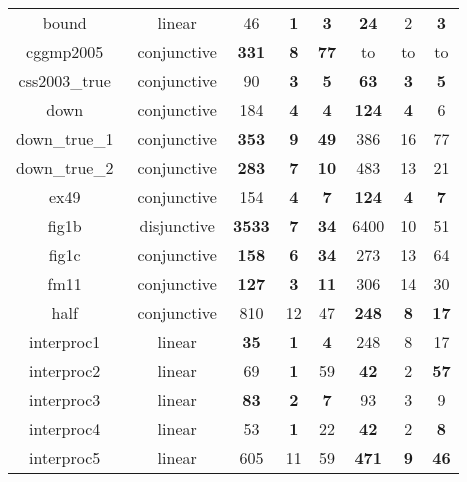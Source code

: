 \begin{table}[t]
\begin{tabular}{l c | c c c | c c c |}
\multicolumn{1}{|c|}{bound~\cite{gupta2009invgen}}				&linear 		&46	&\textbf{1}	&\textbf{3}	&\textbf{24}	&2	&\textbf{3}\\
\multicolumn{1}{|c|}{cggmp2005~\cite{Dirk:SVCOMP:2016}}			&conjunctive	&\textbf{331}	&\textbf{8}	&\textbf{77}	&to	&to	&to	\\
\multicolumn{1}{|c|}{css2003\_true~\cite{Dirk:SVCOMP:2016}}		&conjunctive	&90	&\textbf{3}	&\textbf{5}	&\textbf{63}	&\textbf{3}	&\textbf{5}\\ 
\multicolumn{1}{|c|}{down~\cite{gupta2009invgen}}				&conjunctive	&184	&\textbf{4}	&\textbf{4}       &\textbf{124}	&\textbf{4}	&6		\\
\multicolumn{1}{|c|}{down\_true\_1~\cite{Dirk:SVCOMP:2016}}		&conjunctive 	&\textbf{353}	&\textbf{9}	&\textbf{49}	&386	&16	&77\\
\multicolumn{1}{|c|}{down\_true\_2~\cite{Dirk:SVCOMP:2016}}		&conjunctive 	&\textbf{283}	&\textbf{7}	&\textbf{10}	&483	&13	&21\\
\multicolumn{1}{|c|}{ex49~\cite{necla:benchmark}}				&conjunctive	&154	&\textbf{4}	&\textbf{7}	&\textbf{124}	&\textbf{4}	&\textbf{7}\\
\multicolumn{1}{|c|}{fig1b~\cite{zilu:repo}}					&disjunctive	&\xmark\textbf{3533} 	& \textbf{7} &\textbf{34} 	   & 6400 & 10 		& 51 		\\
\multicolumn{1}{|c|}{fig1c~\cite{zilu:repo}}					&conjunctive	&\textbf{158}	&\textbf{6}	&\textbf{34}	&273	&13	&64\\
\multicolumn{1}{|c|}{fm11~\cite{schwartznon}}					&conjunctive	&\textbf{127}	&\textbf{3}	&\textbf{11}	&306	&14	&30					\\
\multicolumn{1}{|c|}{half~\cite{gupta2009invgen}}				&conjunctive	&810	&12	&47 &\textbf{248}	&\textbf{8}	&\textbf{17}\\
\multicolumn{1}{|c|}{interproc1~\cite{jeannet2010interproc}}	&linear			&\textbf{35}	&\textbf{1}	&\textbf{4}   &248	&8	&17						\\
\multicolumn{1}{|c|}{interproc2~\cite{jeannet2010interproc}}	&linear 		&69	&\textbf{1}	&59	&\textbf{42}	&2	&\textbf{57}\\
\multicolumn{1}{|c|}{interproc3~\cite{jeannet2010interproc}}	&linear			&\textbf{83}	&\textbf{2}	&\textbf{7}   &93	&3	&9			\\
\multicolumn{1}{|c|}{interproc4~\cite{jeannet2010interproc}}	&linear 		&53	&\textbf{1}	&22	&\textbf{42}	&2	&\textbf{8}\\
\multicolumn{1}{|c|}{interproc5~\cite{jeannet2010interproc}}	&linear			&605	&11	&59 &\textbf{471}	&\textbf{9}	&\textbf{46}\\

\end{tabular}
\end{table}
